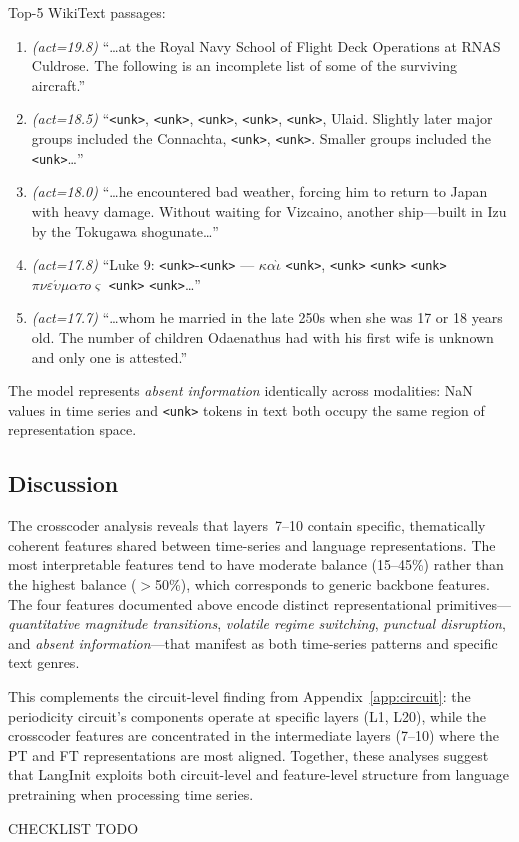 \documentclass{article}
\begin{document}
Top-5 WikiText passages:
\begin{enumerate}[nosep, leftmargin=1.5em]
\item \emph{(act=19.8)} ``\ldots at the Royal Navy School of Flight Deck Operations at RNAS Culdrose.  The following is an incomplete list of some of the surviving aircraft.''
\item \emph{(act=18.5)} ``\texttt{<unk>}, \texttt{<unk>}, \texttt{<unk>}, \texttt{<unk>}, \texttt{<unk>}, Ulaid.  Slightly later major groups included the Connachta, \texttt{<unk>}, \texttt{<unk>}.  Smaller groups included the \texttt{<unk>}\ldots''
\item \emph{(act=18.0)} ``\ldots he encountered bad weather, forcing him to return to Japan with heavy damage.  Without waiting for Vizcaino, another ship---built in Izu by the Tokugawa shogunate\ldots''
\item \emph{(act=17.8)} ``Luke 9: \texttt{<unk>}-\texttt{<unk>} --- $\kappa\alpha\grave{\iota}$ \texttt{<unk>}, \texttt{<unk>} \texttt{<unk>} \texttt{<unk>} $\pi\nu\varepsilon\acute{\upsilon}\mu\alpha\tau o\varsigma$ \texttt{<unk>} \texttt{<unk>}\ldots''
\item \emph{(act=17.7)} ``\ldots whom he married in the late 250s when she was 17 or 18 years old.  The number of children Odaenathus had with his first wife is unknown and only one is attested.''
\end{enumerate}
The model represents \emph{absent information} identically across modalities: NaN values in time series and \texttt{<unk>} tokens in text both occupy the same region of representation space.

\subsection{Discussion}

The crosscoder analysis reveals that layers~7--10 contain specific, thematically coherent features shared between time-series and language representations.  The most interpretable features tend to have moderate balance (15--45\%) rather than the highest balance ($>$50\%), which corresponds to generic backbone features.  The four features documented above encode distinct representational primitives---\emph{quantitative magnitude transitions}, \emph{volatile regime switching}, \emph{punctual disruption}, and \emph{absent information}---that manifest as both time-series patterns and specific text genres.

This complements the circuit-level finding from Appendix~\ref{app:circuit}: the periodicity circuit's components operate at specific layers (L1, L20), while the crosscoder features are concentrated in the intermediate layers (7--10) where the PT and FT representations are most aligned.  Together, these analyses suggest that LangInit exploits both circuit-level and feature-level structure from language pretraining when processing time series.


\newpage
CHECKLIST TODO
% 
\end{document}
